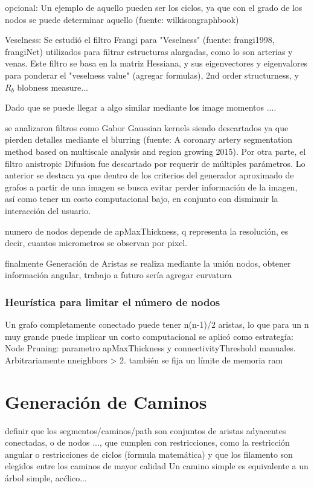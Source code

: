 opcional: Un ejemplo de aquello pueden ser los ciclos, ya que con el grado de los nodos se puede determinar aquello (fuente: wilkisongraphbook)

Veselness: Se estudió el filtro Frangi para "Veselness" (fuente: frangi1998, frangiNet) utilizados para filtrar estructuras alargadas, como lo son arterias y venas. Este filtro se basa en la matriz Hessiana, y sus eigenvectores y eigenvalores para ponderar el "veselness value" (agregar formulas), 2nd order structurness, y $R_b$ blobness measure...

Dado que se puede llegar a algo similar mediante los image momentos ....

se analizaron filtros como Gabor Gaussian kernels siendo descartados ya que pierden detalles mediante el blurring (fuente: A coronary artery segmentation method based on multiscale analysis and region growing 2015). Por otra parte, el filtro  anistropic Difusion fue descartado por requerir de múltiples parámetros. 
Lo anterior se destaca ya que dentro de los criterios del generador aproximado de grafos a partir de una imagen se busca evitar perder información de la imagen, así como tener un costo computacional bajo, en conjunto con disminuir la interacción del usuario. 

numero de nodos depende de apMaxThickness, q representa la resoluci\'on, es decir, cuantos micrometros se observan por pixel.

finalmente Generaci\'on de Aristas se realiza mediante la uni\'on nodos, obtener informaci\'on angular, trabajo a futuro ser\'ia agregar curvatura 

\subsubsection{Heurística para limitar el n\'umero de nodos}
Un grafo completamente conectado puede tener n(n-1)/2 aristas, lo que para un n muy grande puede implicar un costo computacional se aplicó como estrategía: 
Node Pruning: parametro apMaxThickness y connectivityThreshold manuales. Arbitrariamente n\textdegree neighbors > 2. también se fija un límite de memoria ram


\section{Generaci\'on de Caminos}
definir que los segmentos/caminos/path son conjuntos de aristas adyacentes conectadas, o de nodos ..., que cumplen con restricciones, como la restricción angular o restricciones de ciclos (formula matem\'atica) y que los filamento son elegidos entre los caminos de mayor calidad
Un camino simple es equivalente a un \'arbol simple, ac\'clico...


